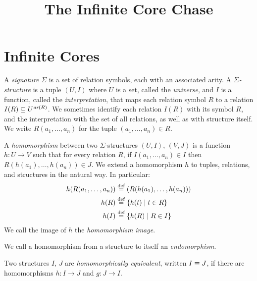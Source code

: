\documentclass[acmsmall,screen,nonacm,review]{acmart}
\begin{document}
\title{The Infinite Core Chase}

\maketitle

\section{Infinite Cores}

\begin{definition}
    A {\em signature} $\Sigma$ is a set of relation symbols, 
    each with an associated arity.
    A {\em $\Sigma$-structure} is a tuple $(U, I)$ where $U$ is a set, 
    called the {\em universe}, and $I$ is a function, called the {\em interpretation},
    that maps each relation symbol $R$ to a relation $I(R) \subseteq U^{\textit{ar}(R)}$. 
    We sometimes identify each relation $I(R)$ with its symbol $R$, 
    and the interpretation with the set of all relations, 
    as well as with structure itself.
    We write $R(a_1, \ldots, a_n)$ for the tuple $(a_1, \ldots, a_n) \in R$.
\end{definition}

\begin{definition}
    A {\em homomorphism} between two $\Sigma$-structures $(U, I)$, $(V, J)$
    is a function $h: U \to V$ such that for every relation $R$,
    if $I(a_1, \ldots, a_n) \in I$ then $R(h(a_1), \ldots, h(a_n)) \in J$.
    We extend a homomorphism $h$ to tuples, relations, and structures 
    in the natural way.
    In particular: 
\begin{align*}
    h(R(a_1, \ldots, a_n)) & \stackrel{\text{def}}{=} (R(h(a_1), \ldots, h(a_n))) \\
    h(R) & \stackrel{\text{def}}{=} \{{h(t)}\mid{t \in R}\} \\
    h(I) & \stackrel{\text{def}}{=} \{{h(R)}\mid{R \in I}\}
\end{align*}
We call the image of $h$ the {\em homomorphism image}.
\end{definition}

\begin{definition}
    We call a homomorphism from a structure to itself an {\em endomorphism}.
\end{definition}

\begin{definition}
    Two structures $I$, $J$ are {\em homomorphically equivalent}, 
    written $I \equiv J$,
    if there are homomorphisms $h: I \to J$ and $g: J \to I$.
\end{definition}
\end{document}
